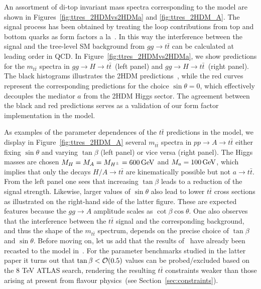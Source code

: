 An assortment of di-top invariant mass spectra corresponding to the \hdma model are shown in Figures~\ref{fig:ttres_2HDMvs2HDMa} and \ref{fig:ttres_2HDM_A}. The signal process has been obtained by treating the loop contributions from top and bottom quarks as form factors a la~\cite{FranzosiZhang}. In this way the interference between the signal and the tree-level SM background from $gg \to t \bar t$ can be calculated at leading order in QCD. In Figure~\ref{fig:ttres_2HDMvs2HDMa}, we show predictions for the $m_{t \bar t}$ spectra in $gg \to H \to t \bar t$~(left panel) and $gg \to H \to t \bar t$~(right panel). The black histograms illustrates the 2HDM predictions~\cite{Aaboud:2017hnm}, while the red curves represent the corresponding \hdma predictions for the choice $\sin \theta = 0$, which effectively decouples the mediator $a$ from the 2HDM Higgs sector. The agreement between the black and red predictions serves as a validation of our form factor implementation in the \hdma model. 

As examples of the parameter dependences of the $t \bar t$ predictions in the \hdma model, we display in  Figure~\ref{fig:ttres_2HDM_A} several $m_{t \bar t}$ spectra in $pp \to A \to t \bar t$ either fixing $\sin \theta$ and varying $\tan \beta$ (left panel) or vice versa (right panel). The Higgs masses are chosen $M_{H}=M_{A}=M_{H^{\pm}} =600 \, {\rm GeV}$ and $M_{a}=100 \, {\rm GeV}$, which implies that only the  decays $H/A \to t \bar t$  are kinematically possible but not $a \to t \bar t$.  From the left panel one sees that increasing $\tan \beta$ leads  to a reduction of the signal strength.  Likewise, larger values of $\sin \theta$ also lead to lower $t \bar t$ cross sections as illustrated on the right-hand side of the latter figure. These are expected features because the $g g \to A$ amplitude  scales as $\cot \beta \cos \theta$.  One also observes that the interference between the $t \bar t$ signal and the corresponding background, and thus the shape of the $m_{t \bar t}$ spectrum, depends on the precise choice of $\tan \beta$  and $\sin \theta$.  Before moving on, let us add that the results of~\cite{Aaboud:2017hnm} have already been recasted to the \hdma model in~\cite{Bauer:2017ota}. For the parameter benchmarks studied in the latter paper it turns out that $\tan \beta < {\cal O} ( 0.5)$ values can be probed/excluded based on the 8 TeV ATLAS search, rendering the resulting $t \bar t$ constraints weaker than those arising at present from flavour physics~(see Section~\ref{sec:constraints}). 

